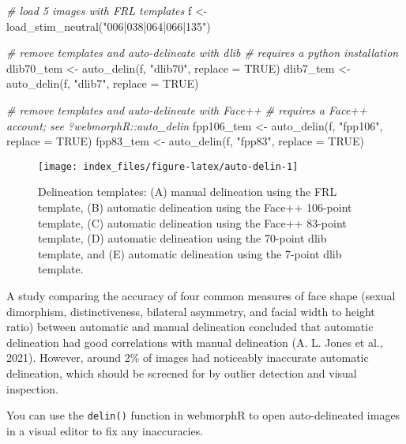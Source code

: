 \documentclass[
  doc,floatsintext]{apa6}
\newenvironment{Shaded}{\begin{snugshade}}{\end{snugshade}}
\newcommand{\AttributeTok}[1]{\textcolor[rgb]{0.77,0.63,0.00}{#1}}
\newcommand{\CommentTok}[1]{\textcolor[rgb]{0.56,0.35,0.01}{\textit{#1}}}
\newcommand{\ConstantTok}[1]{\textcolor[rgb]{0.00,0.00,0.00}{#1}}
\newcommand{\FunctionTok}[1]{\textcolor[rgb]{0.00,0.00,0.00}{#1}}
\newcommand{\NormalTok}[1]{#1}
\newcommand{\OtherTok}[1]{\textcolor[rgb]{0.56,0.35,0.01}{#1}}
\newcommand{\StringTok}[1]{\textcolor[rgb]{0.31,0.60,0.02}{#1}}
\begin{document}
\begin{Shaded}
\begin{Highlighting}[]
\CommentTok{\# load 5 images with FRL templates}
\NormalTok{f }\OtherTok{\textless{}{-}} \FunctionTok{load\_stim\_neutral}\NormalTok{(}\StringTok{"006|038|064|066|135"}\NormalTok{)}

\CommentTok{\# remove templates and auto{-}delineate with dlib}
\CommentTok{\# requires a python installation}
\NormalTok{dlib70\_tem }\OtherTok{\textless{}{-}} \FunctionTok{auto\_delin}\NormalTok{(f, }\StringTok{"dlib70"}\NormalTok{, }\AttributeTok{replace =} \ConstantTok{TRUE}\NormalTok{)}
\NormalTok{dlib7\_tem }\OtherTok{\textless{}{-}} \FunctionTok{auto\_delin}\NormalTok{(f, }\StringTok{"dlib7"}\NormalTok{, }\AttributeTok{replace =} \ConstantTok{TRUE}\NormalTok{)}

\CommentTok{\# remove templates and auto{-}delineate with Face++}
\CommentTok{\# requires a Face++ account; see ?webmorphR::auto\_delin}
\NormalTok{fpp106\_tem }\OtherTok{\textless{}{-}} \FunctionTok{auto\_delin}\NormalTok{(f, }\StringTok{"fpp106"}\NormalTok{, }\AttributeTok{replace =} \ConstantTok{TRUE}\NormalTok{)}
\NormalTok{fpp83\_tem }\OtherTok{\textless{}{-}} \FunctionTok{auto\_delin}\NormalTok{(f, }\StringTok{"fpp83"}\NormalTok{, }\AttributeTok{replace =} \ConstantTok{TRUE}\NormalTok{)}
\end{Highlighting}
\end{Shaded}

\begin{figure}
\texttt{[image: index\_files/figure-latex/auto-delin-1]} \caption{Delineation templates: (A) manual delineation using the FRL template, (B) automatic delineation using the Face++ 106-point template, (C) automatic delineation using the Face++ 83-point template, (D) automatic delineation using the 70-point dlib template, and (E) automatic delineation using the 7-point dlib template.}\label{fig:auto-delin}
\end{figure}

A study comparing the accuracy of four common measures of face shape (sexual dimorphism, distinctiveness, bilateral asymmetry, and facial width to height ratio) between automatic and manual delineation concluded that automatic delineation had good correlations with manual delineation (A. L. Jones et al., 2021). However, around 2\% of images had noticeably inaccurate automatic delineation, which should be screened for by outlier detection and visual inspection.

You can use the \texttt{delin()} function in webmorphR to open auto-delineated images in a visual editor to fix any inaccuracies.
\end{document}
